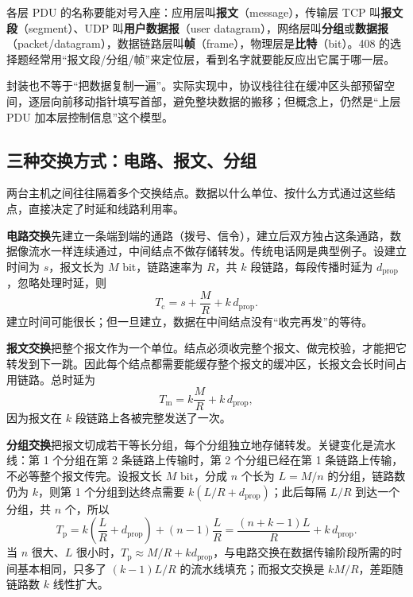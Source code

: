 各层 PDU 的名称要能对号入座：应用层叫\textbf{报文}（message），传输层 TCP 叫\textbf{报文段}（segment）、UDP 叫\textbf{用户数据报}（user datagram），网络层叫\textbf{分组}或\textbf{数据报}（packet/datagram），数据链路层叫\textbf{帧}（frame），物理层是\textbf{比特}（bit）。408 的选择题经常用“报文段/分组/帧”来定位层，看到名字就要能反应出它属于哪一层。

封装也不等于“把数据复制一遍”。实际实现中，协议栈往往在缓冲区头部预留空间，逐层向前移动指针填写首部，避免整块数据的搬移；但概念上，仍然是“上层 PDU 加本层控制信息”这个模型。

\subsection{三种交换方式：电路、报文、分组}

两台主机之间往往隔着多个交换结点。数据以什么单位、按什么方式通过这些结点，直接决定了时延和线路利用率。

\textbf{电路交换}先建立一条端到端的通路（拨号、信令），建立后双方独占这条通路，数据像流水一样连续通过，中间结点不做存储转发。传统电话网是典型例子。设建立时间为 $s$，报文长为 $M$ bit，链路速率为 $R$，共 $k$ 段链路，每段传播时延为 $d_{\mathrm{prop}}$，忽略处理时延，则
\[
T_{\mathrm{c}} = s + \frac{M}{R} + k\,d_{\mathrm{prop}}.
\]
建立时间可能很长；但一旦建立，数据在中间结点没有“收完再发”的等待。

\textbf{报文交换}把整个报文作为一个单位。结点必须收完整个报文、做完校验，才能把它转发到下一跳。因此每个结点都需要能缓存整个报文的缓冲区，长报文会长时间占用链路。总时延为
\[
T_{\mathrm{m}} = k\frac{M}{R} + k\,d_{\mathrm{prop}},
\]
因为报文在 $k$ 段链路上各被完整发送了一次。

\textbf{分组交换}把报文切成若干等长分组，每个分组独立地存储转发。关键变化是流水线：第 1 个分组在第 2 条链路上传输时，第 2 个分组已经在第 1 条链路上传输，不必等整个报文传完。设报文长 $M$ bit，分成 $n$ 个长为 $L=M/n$ 的分组，链路数仍为 $k$，则第 1 个分组到达终点需要 $k(L/R+d_{\mathrm{prop}})$；此后每隔 $L/R$ 到达一个分组，共 $n$ 个，所以
\[
T_{\mathrm{p}} = k\left(\frac{L}{R}+d_{\mathrm{prop}}\right) + (n-1)\frac{L}{R}
= \frac{(n+k-1)L}{R} + k\,d_{\mathrm{prop}}.
\]
当 $n$ 很大、$L$ 很小时，$T_{\mathrm{p}} \approx M/R + k d_{\mathrm{prop}}$，与电路交换在数据传输阶段所需的时间基本相同，只多了 $(k-1)L/R$ 的流水线填充；而报文交换是 $kM/R$，差距随链路数 $k$ 线性扩大。


